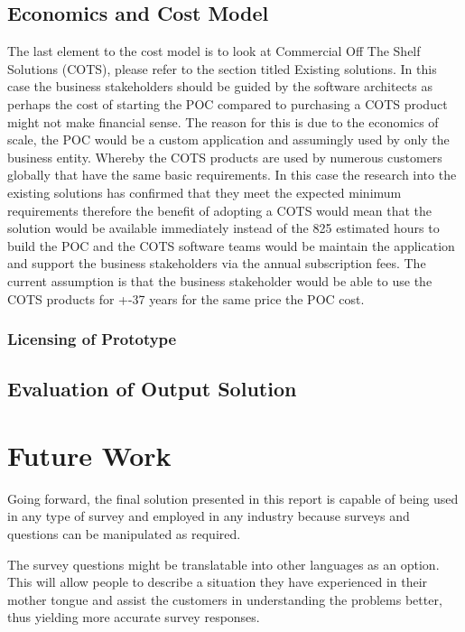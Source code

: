 \documentclass[12pt]{witseiepaper}
\begin{document}
\subsection{Economics and Cost Model}
The last element to the cost model is to look at Commercial Off The Shelf Solutions (COTS),  please refer to the section titled Existing solutions. In this case the business stakeholders should be guided by the software architects as perhaps the cost of starting the POC compared to purchasing a COTS product might not make financial sense. The reason for this is due to the economics of scale, the POC would be a custom application and assumingly used by only the business entity. Whereby the COTS products are used by numerous customers globally that have the same basic requirements. In this case the research into the existing solutions has confirmed that they meet the expected minimum requirements therefore the benefit of adopting a COTS would mean that the solution would be available immediately instead of the 825 estimated hours to build the POC and the COTS software teams would be maintain the application and support the business stakeholders via the annual subscription fees. The current assumption is that the business stakeholder would be able to use the COTS products for +-37 years for the same price the POC cost.


\subsubsection{Licensing of Prototype}


\subsection{Evaluation of Output Solution}


\section{Future Work}
Going forward, the final solution presented in this report is capable of being used in any type of survey and employed in any industry because surveys and questions can be manipulated as required.

The survey questions might be translatable into other languages as an option. This will allow people to describe a situation they have experienced in their mother tongue and assist the customers in understanding the problems better, thus yielding more accurate survey responses.
\end{document}
